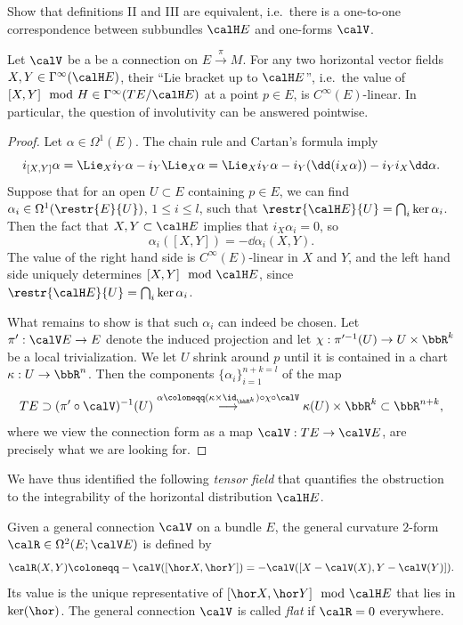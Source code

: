 \begin{xca}
    Show that definitions II and III are equivalent, i.e.\ there is a one-to-one correspondence between subbundles $\calH E$ and one-forms $\calV$.
\end{xca}


\begin{prop}
    Let $\calV$ be a be a connection on $E\overset{\pi}{\to}M$. For any two horizontal vector fields $X,Y\in\Gamma^\infty(\calH E)$, their ``Lie bracket up to $\calH E$'', i.e.\ the value of $[X,Y]\mod H\in \Gamma^\infty(TE\slash \calH E)$ at a point $p\in E$, is $C^\infty(E)$-linear. In particular, the question of involutivity can be answered pointwise.
\end{prop}
\begin{proof}
    Let $\alpha\in\Omega^1(E)$. The chain rule and Cartan's formula imply
    \[i_{[X,Y]}\alpha=\Lie_Xi_Y \alpha-i_Y \Lie_X\alpha=\Lie_Xi_Y\alpha-i_Y(\dd (i_X\alpha))-i_Yi_X\dd\alpha.\]
    Suppose that for an open $U\subset E$ containing $p\in E$, we can find $\alpha_i\in\Omega^1(\restr{E}{U})$, $1\leq i\leq l$, such that $\restr{\calH E}{U}=\bigcap_i\ker\alpha_i$. Then the fact that $X,Y\subset \calH E$ implies that $i_X\alpha_i=0$, so
    \[\alpha_i([X,Y])=-\dd\alpha_i(X,Y).\]
    The value of the right hand side is $C^\infty(E)$-linear in $X$ and $Y$, and the left hand side uniquely determines $[X,Y]\mod \calH E$, since $\restr{\calH E}{U}=\bigcap_i \ker\alpha_i$. 

    What remains to show is that such $\alpha_i$ can indeed be chosen. Let $\pi':\calV E\to E$ denote the induced projection and let $\chi:\pi^{\prime-1}(U)\to U\times\bbR^k$ be a local trivialization. We let $U$ shrink around $p$ until it is contained in a chart $\kappa:U\to \bbR^n$. Then the components $\{\alpha_i\}_{i=1}^{n+k=l}$ of the map
    \[TE\supset (\pi'\circ\calV)^{-1}(U)\overset{\alpha\coloneqq (\kappa\times\id_{\bbR^k})\circ\chi\circ \calV}{\longrightarrow}\kappa(U)\times\bbR^k\subset \bbR^{n+k},\]
    where we view the connection form as a map $\calV:TE\to \calV E$, are precisely what we are looking for.
\end{proof}

We have thus identified the following \emph{tensor field} that quantifies the obstruction to the integrability of the horizontal distribution $\calH E$.

\begin{defn}
    Given a general connection $\calV$ on a bundle $E$, the general curvature $2$-form $\calR\in \Omega^2(E;\calV E)$ is defined by
    \[\calR(X,Y)\coloneqq -\calV([\hor X,\hor Y])=-\calV([X-\calV(X),Y-\calV(Y)]).\]
    Its value is the unique representative of $[\hor X,\hor Y]\mod \calH E$ that lies in $\ker(\hor)$. The general connection $\calV$ is called \emph{flat} if $\calR=0$ everywhere.
\end{defn}


